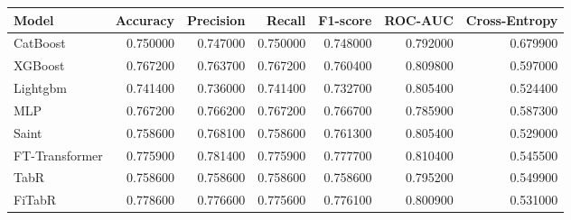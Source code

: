 \begin{tabular}{lrrrrrr}
\toprule
Model & Accuracy & Precision & Recall & F1-score & ROC-AUC & Cross-Entropy \\
\midrule
CatBoost & 0.750000 & 0.747000 & 0.750000 & 0.748000 & 0.792000 & 0.679900 \\
XGBoost & 0.767200 & 0.763700 & 0.767200 & 0.760400 & 0.809800 & 0.597000 \\
Lightgbm & 0.741400 & 0.736000 & 0.741400 & 0.732700 & 0.805400 & 0.524400 \\
MLP & 0.767200 & 0.766200 & 0.767200 & 0.766700 & 0.785900 & 0.587300 \\
Saint & 0.758600 & 0.768100 & 0.758600 & 0.761300 & 0.805400 & 0.529000 \\
FT-Transformer & 0.775900 & 0.781400 & 0.775900 & 0.777700 & 0.810400 & 0.545500 \\
TabR & 0.758600 & 0.758600 & 0.758600 & 0.758600 & 0.795200 & 0.549900 \\
FiTabR & 0.778600 & 0.776600 & 0.775600 & 0.776100 & 0.800900 & 0.531000 \\
\bottomrule
\end{tabular}
